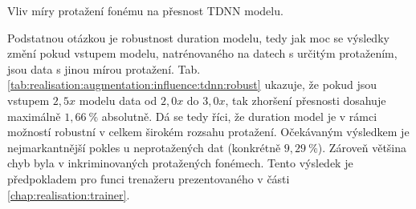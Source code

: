 \begin{table}[htpb]
  \centering
  \def\arraystretch{1.5}
  \caption{Vliv míry protažení fonému na přesnost TDNN modelu.}
  \label{tab:realisation:augmentation:influence:tdnn}
\end{table}

Podstatnou otázkou je robustnost duration modelu, tedy jak moc se výsledky změní pokud vstupem modelu, natrénovaného na datech s určitým protažením, jsou data s jinou mírou protažení. Tab. \ref{tab:realisation:augmentation:influence:tdnn:robust} ukazuje, že pokud jsou vstupem $2,5x$ modelu data od $2,0x$ do $3,0x$, tak zhoršení přesnosti dosahuje maximálně $1,66\ \%$ absolutně. Dá se tedy říci, že duration model je v rámci možností robustní v celkem širokém rozsahu protažení. Očekávaným výsledkem je nejmarkantnější pokles u neprotažených dat (konkrétně $9,29\ \%$). Zároveň většina chyb byla v inkriminovaných protažených fonémech. Tento výsledek je předpokladem pro funci trenažeru prezentovaného v části \ref{chap:realisation:trainer}.

